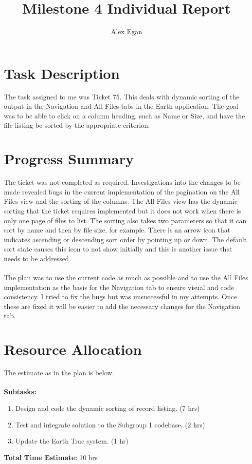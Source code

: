 \documentclass[10pt, a4]{article}
\begin{document}
\title{Milestone 4 Individual Report}
\author{Alex Egan}
\date{ }

\maketitle
 
\section{Task Description}
The task assigned to me was Ticket 75. This deals with dynamic sorting of the output in the Navigation and All Files tabs in the Earth application. The goal was to be able to click on a column heading, such as Name or Size, and have the file listing be sorted by the appropriate criterion.

\section{Progress Summary}
\label{prog-sum}
The ticket was not completed as required. Investigations into the changes to be made revealed bugs in the current implementation of the pagination on the All Files view and the sorting of the columns. The All Files view has the dynamic sorting that the ticket requires implemented but it does not work when there is only one page of files to list. The sorting also takes two parameters so that it can sort by name and then by file size, for example. There is an arrow icon that indicates ascending or descending sort order by pointing up or down. The default sort state causes this icon to not show initially and this is another issue that needs to be addressed.\\
\\
The plan was to use the current code as much as possible and to use the All Files implementation as the basis for the Navigation tab to ensure visual and code consistency. I tried to fix the bugs but was unsuccessful in my attempts. Once these are fixed it will be easier to add the necessary changes for the Navigation tab.

\section{Resource Allocation}
The estimate as in the plan is below.\\
\\
\textbf{Subtasks:}
\begin{enumerate}
	\item Design and code the dynamic sorting of record listing. (7 hrs)
	\item Test and integrate solution to the Subgroup 1 codebase. (2 hrs)
	\item Update the Earth Trac system. (1 hr)
\end{enumerate}
\textbf{Total Time Estimate:} 10 hrs
\end{document}
